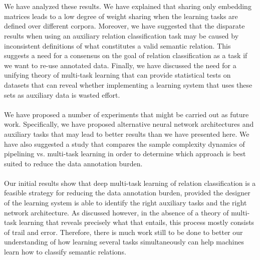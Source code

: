\\\\
We have analyzed these results. We have explained that sharing only embedding matrices leads to a low degree of weight sharing when the learning tasks are defined over different corpora. Moreover, we have suggested that the disparate results when using an auxiliary relation classification task may be caused by inconsistent definitions of what constitutes a valid semantic relation. This suggests a need for a consensus on the goal of relation classification as a task if we want to re-use annotated data. Finally, we have discussed the need for a unifying theory of multi-task learning that can provide statistical tests on datasets that can reveal whether implementing a learning system that uses these sets as auxiliary data is wasted effort.
\\\\
We have proposed a number of experiments that might be carried out as future work. Specifically, we have proposed alternative neural network architectures and auxiliary tasks that may lead to better results than we have presented here. We have also suggested a study that compares the sample complexity dynamics of pipelining vs. multi-task learning in order to determine which approach is best suited to reduce the data annotation burden.
\\\\
Our initial results show that deep multi-task learning of relation classification is a feasible strategy for reducing the data annotation burden, provided the designer of the learning system is able to identify the right auxiliary tasks and the right network architecture. As discussed however, in the absence of a theory of multi-task learning that reveals precisely what that entails, this process mostly consists of trail and error. Therefore, there is much work still to be done to better our understanding of how learning several tasks simultaneously can help machines learn how to classify semantic relations.